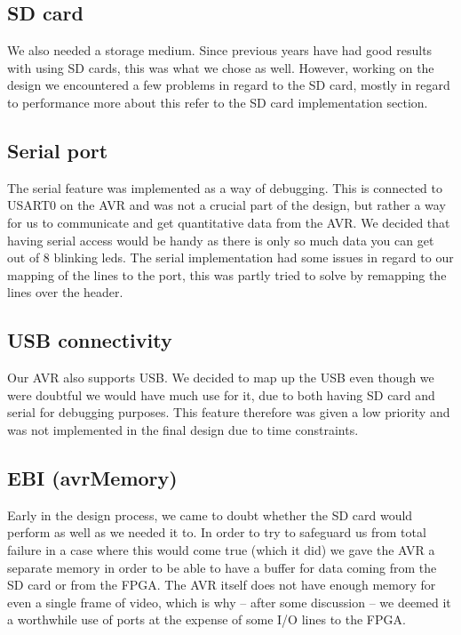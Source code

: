 \subsection{SD card}

We also needed a storage medium. Since previous years have had good results with using SD cards, this was what we chose as well. However, working on the design we encountered a few problems in regard to the SD card, mostly in regard to performance more about this refer to the SD card implementation section. 

\subsection{Serial port}

The serial feature was implemented as a way of debugging. This is connected to USART0 on the AVR and was not a crucial part of the design, but rather a way for us to communicate and get quantitative data from the AVR. We decided that having serial access would be handy as there is only so much data you can get out of 8 blinking leds. The serial implementation had some issues in regard to our mapping of the lines to the port, this was partly tried to solve by remapping the lines over the header.

\subsection{USB connectivity}

Our AVR also supports USB. We decided to map up the USB even though we were doubtful we would have much use for it, due to both having SD card and serial for debugging purposes. This feature therefore was given a low priority and was not implemented in the final design due to time constraints.
 
\subsection{EBI (avrMemory)}

Early in the design process, we came to doubt whether the SD card would perform as well as we needed it to. In order to try to safeguard us from total failure in a case where this would come true (which it did) we gave the AVR a separate memory in order to be able to have a buffer for data coming from the SD card or from the FPGA. The AVR itself does not have enough memory for even a single frame of video, which is why -- after some discussion -- we deemed it a worthwhile use of ports at the expense of some I/O lines to the FPGA.

